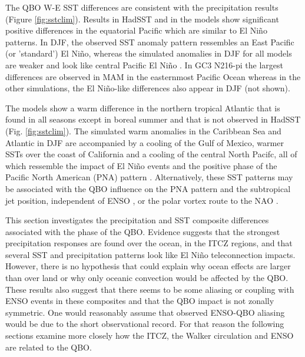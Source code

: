 The QBO W-E SST differences are consistent with the precipitation results (Figure \ref{fig:sstclim}).
Results in HadSST and in the models show significant positive differences in the equatorial Pacific which are similar to El Niño patterns.
In DJF, the observed SST anomaly pattern ressembles an East Pacific (or 'standard') El Niño, whereas the simulated anomalies in DJF for all models are weaker and look like central Pacific El Niño \citep{capotondi2015}. In GC3 N216-pi the largest differences are observed in MAM in the easternmost Pacific Ocean whereas in the other simulations, the El Niño-like differences also appear in DJF (not shown).

The models show a warm difference in the northern tropical Atlantic that is found in all seasons except in boreal summer and that is not observed in HadSST (Fig. \ref{fig:sstclim}). The simulated warm anomalies in the Caribbean Sea and Atlantic in DJF are accompanied by a cooling of the Gulf of Mexico, warmer SSTs over the coast of California and a cooling of the central North Pacifc, all of which ressemble the impact of El Niño events and the positive phase of the Pacific North American (PNA) pattern  \citep{deser2010sea,guo2017distinct,jimenezesteve2020}. Alternatively, these SST patterns may be associated with the QBO influence on the PNA pattern and the subtropical jet position, independent of ENSO \citep{garfinkel2011}, or the polar vortex route to the NAO \citep{gray2018}. 

This section investigates the precipitation and SST composite differences associated with the phase of the QBO. Evidence suggests that the strongest precipitation responses   are found over the ocean, in the ITCZ regions, and that several SST and precipitation patterns look like El Niño teleconnection impacts. However, there is no hypothesis that could explain why ocean effects are larger than over land or why only oceanic convection would be affected by the QBO.
These results also suggest that there seems to be some aliasing or coupling with ENSO events in these composites and that the QBO impact is not zonally symmetric. One would reasonably assume that observed ENSO-QBO aliasing would be due to the short observational record. For that reason the following sections examine more closely how the ITCZ, the Walker circulation and ENSO are related to the QBO.


